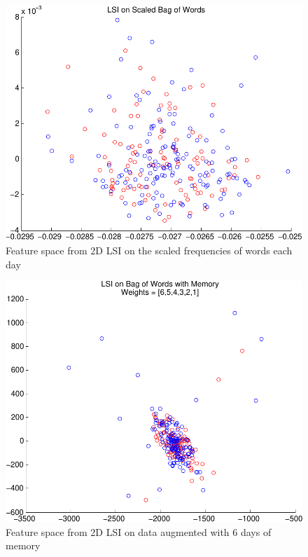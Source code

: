 \documentclass[10pt, twocolumn]{article}
\begin{document}
\begin{figure}
\centering
\includegraphics[scale=0.4]{plots/lsiscaled.pdf}
\caption{Feature space from 2D LSI on the scaled frequencies of words each day}
\label{lsiscaled}
\end{figure}

\begin{figure}
\centering
\includegraphics[scale=0.4]{plots/lsimem.pdf}
\caption{Feature space from 2D LSI on data augmented with 6 days of memory}
\label{lsimem}
\end{figure}
\end{document}
